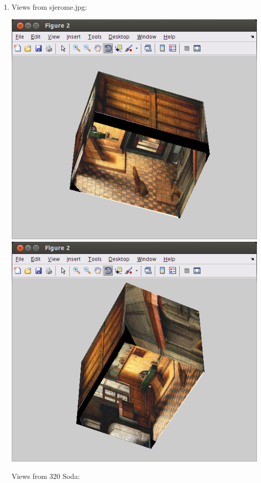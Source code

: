\documentclass[11pt]{article}
\begin{document}
\begin{enumerate}
\item
    Views from sjerome.jpg:

    \includegraphics[width=0.5\linewidth]{./../img/sjerome_floor_ceiling.png}
    \includegraphics[width=0.5\linewidth]{./../img/sjerome_side_walls.png}

    Views from 320 Soda:


\end{enumerate}
\end{document}
